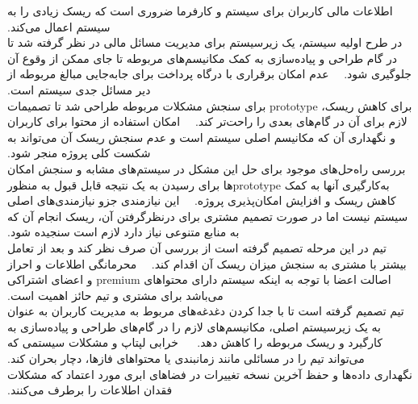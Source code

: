‫
‫
‫
‫ اطلاعات مالی کاربران برای سیستم و کارفرما ضروری است که ریسک زیادی را به سیستم اعمال می‌کند.
‫\\
‫ در طرح اولیه سیستم، یک زیرسیستم برای مدیریت مسائل مالی در نظر گرفته شد تا در گام طراحی  و پیاده‌سازی به کمک مکانیسم‌های مربوطه تا جای ممکن از وقوع آن جلوگیری شود.
‫
‫
‫ عدم امکان برقراری با درگاه پرداخت برای جابه‌جایی مبالغ مربوطه از دیر مسائل جدی سیستم است.
‫\\
‫ برای کاهش ریسک، prototype برای سنجش مشکلات مربوطه طراحی شد تا تصمیمات لازم برای آن در گام‌های بعدی را راحت‌تر کند.
‫
‫
‫ امکان استفاده از محتوا برای کاربران و نگهداری آن که مکانیسم اصلی سیستم است و عدم سنجش ریسک آن می‌تواند به شکست کلی پروژه منجر شود.
‫\\
‫ بررسی راه‌حل‌های موجود برای حل این مشکل در سیستم‌های مشابه و سنجش امکان به‌کارگیری آنها به کمک prototypeها برای رسیدن به یک نتیجه قابل قبول به منظور کاهش ریسک و افزایش امکان‌پذیری پروژه.
‫
‫
‫ این نیازمندی جزو نیازمندی‌های اصلی سیستم نیست اما در صورت تصمیم مشتری برای درنظرگرفتن آن، ریسک انجام آن که به منابع متنوعی نیاز دارد لازم است سنجیده شود.
‫\\
‫ تیم در این مرحله تصمیم گرفته است از بررسی آن صرف نظر کند و بعد از تعامل بیشتر با مشتری به سنجش میزان ریسک آن اقدام کند.
‫
‫
‫ محرمانگی اطلاعات و احراز اصالت اعضا با توجه به اینکه سیستم دارای محتواهای premium و اعضای اشتراکی می‌باشد برای مشتری و تیم حائز اهمیت است.
‫\\
‫ تیم تصمیم گرفته است تا با جدا کردن دغدغه‌های مربوط به مدیریت کاربران به عنوان به یک زیرسیستم اصلی، مکانیسم‌های لازم را در گام‌های طراحی و پیاده‌سازی به کارگیرد و ریسک مربوطه را کاهش دهد.
‫
‫
‫
‫ خرابی لپتاپ و مشکلات سیستمی که می‌تواند تیم را در مسائلی مانند زمانبندی یا محتواهای فازها، دچار بحران کند.
‫\\
‫ نگهداری داده‌ها و حفظ آخرین نسخه تغییرات در فضاهای ابری مورد اعتماد که مشکلات فقدان اطلاعات را برطرف می‌کنند. 
‫
‫
‫
‫
‫
